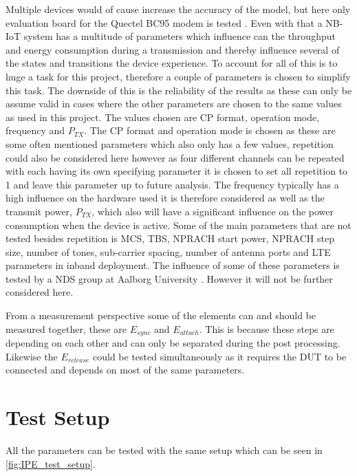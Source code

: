 Multiple devices would of cause increase the accuracy of the model, but here only evaluation board for the Quectel BC95 modem is tested \citep{BC95}. Even with that a \gls{NB-IoT} system has a multitude of parameters which influence can the throughput and energy consumption during a transmission and thereby influence several of the states and transitions the device experience. To account for all of this is to huge a task for this project, therefore a couple of parameters is chosen to simplify this task. The downside of this is the reliability of the results as these can only be assume valid in cases where the other parameters are chosen to the same values as used in this project. The values chosen are CP format, operation mode, frequency and $P_{TX}$. The CP format and operation mode is chosen as these are some often mentioned parameters which also only has a few values, repetition could also be considered here however as four different channels can be repeated with each having its own specifying parameter it is chosen to set all repetition to 1 and leave this parameter up to future analysis. The frequency typically has a high influence on the hardware used it is therefore considered as well as the transmit power, $P_{TX}$, which also will have a significant influence on the power consumption when the device is active. Some of the main parameters that are not tested besides repetition is \gls{MCS}, \gls{TBS}, NPRACH start power, NPRACH step size, number of tones, sub-carrier spacing, number of antenna ports and LTE parameters in inband deployment. The influence of some of these parameters is tested by a NDS group at Aalborg University . However it will not be further considered here.

From a measurement perspective some of the elements can and should be measured together, these are $E_{sync}$ and $E_{attach}$. This is because these steps are depending on each other and can only be separated during the  post processing. Likewise the $E_{release}$ could be tested simultaneously as it requires the DUT to be connected and depends on most of the same parameters.  



\section{Test Setup}
All the parameters can be tested with the same setup which can be seen in \autoref{fig:IPE_test_setup}.

